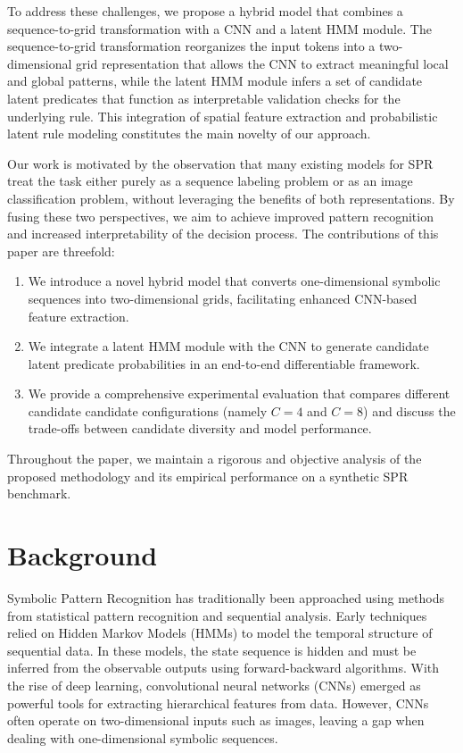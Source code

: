 \documentclass[11pt]{article}
\begin{document}
To address these challenges, we propose a hybrid model that combines a sequence-to-grid transformation with a CNN and a latent HMM module. The sequence-to-grid transformation reorganizes the input tokens into a two-dimensional grid representation that allows the CNN to extract meaningful local and global patterns, while the latent HMM module infers a set of candidate latent predicates that function as interpretable validation checks for the underlying rule. This integration of spatial feature extraction and probabilistic latent rule modeling constitutes the main novelty of our approach.

Our work is motivated by the observation that many existing models for SPR treat the task either purely as a sequence labeling problem or as an image classification problem, without leveraging the benefits of both representations. By fusing these two perspectives, we aim to achieve improved pattern recognition and increased interpretability of the decision process. The contributions of this paper are threefold:
\begin{enumerate}
    \item We introduce a novel hybrid model that converts one-dimensional symbolic sequences into two-dimensional grids, facilitating enhanced CNN-based feature extraction.
    \item We integrate a latent HMM module with the CNN to generate candidate latent predicate probabilities in an end-to-end differentiable framework.
    \item We provide a comprehensive experimental evaluation that compares different candidate candidate configurations (namely \(C=4\) and \(C=8\)) and discuss the trade-offs between candidate diversity and model performance.
\end{enumerate}
Throughout the paper, we maintain a rigorous and objective analysis of the proposed methodology and its empirical performance on a synthetic SPR benchmark.

\section{Background}
Symbolic Pattern Recognition has traditionally been approached using methods from statistical pattern recognition and sequential analysis. Early techniques relied on Hidden Markov Models (HMMs) to model the temporal structure of sequential data. In these models, the state sequence is hidden and must be inferred from the observable outputs using forward-backward algorithms. With the rise of deep learning, convolutional neural networks (CNNs) emerged as powerful tools for extracting hierarchical features from data. However, CNNs often operate on two-dimensional inputs such as images, leaving a gap when dealing with one-dimensional symbolic sequences.
\end{document}
